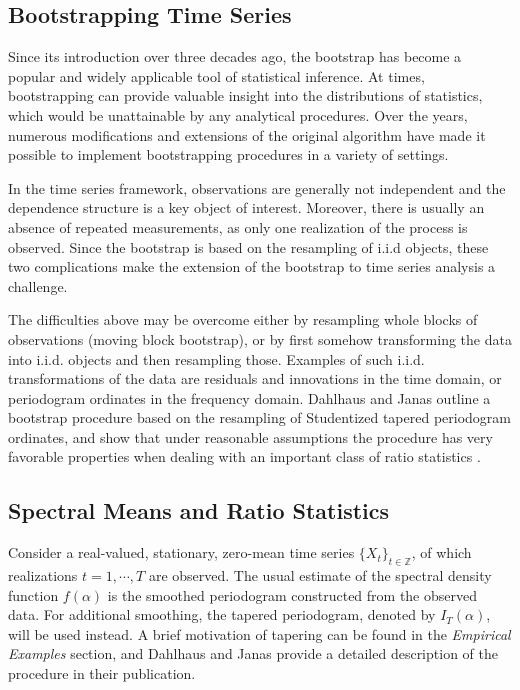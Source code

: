 
\subsection*{Bootstrapping Time Series}
Since its introduction over three decades ago, the bootstrap has become a popular and widely applicable tool of statistical inference. At times, bootstrapping can provide valuable insight into the distributions of statistics, which would be unattainable by any analytical procedures. Over the years, numerous modifications and extensions of the original algorithm have made it possible to implement bootstrapping procedures in a variety of settings.

In the time series framework, observations are generally not independent and the dependence structure is a key object of interest. Moreover, there is usually an absence of repeated measurements, as only one realization of the process is observed. Since the bootstrap is based on the resampling of i.i.d objects, these two complications make the extension of the bootstrap to time series analysis a challenge.

The difficulties above may be overcome either by resampling whole blocks of observations (moving block bootstrap), or by first somehow transforming the data into i.i.d. objects and then resampling those. Examples of such i.i.d. transformations of the data are residuals and innovations in the time domain, or periodogram ordinates in the frequency domain. Dahlhaus and Janas outline a bootstrap procedure based on the resampling of Studentized tapered periodogram ordinates, and show that under reasonable assumptions the procedure has very favorable properties when dealing with an important class of ratio statistics \cite{bootstrap}.

\subsection*{Spectral Means and Ratio Statistics}

Consider a real-valued, stationary, zero-mean time series $\{X_t \}_{t\in\mathbb{Z}}$, of which realizations $t=1,\cdots,T$ are observed. The usual estimate of the spectral density function $f(\alpha)$ is the smoothed periodogram constructed from the observed data. For additional smoothing, the tapered periodogram, denoted by $I_T(\alpha)$, will be used instead. A brief motivation of tapering can be found in the \textit{Empirical Examples} section, and Dahlhaus and Janas provide a detailed description of the procedure in their publication.

